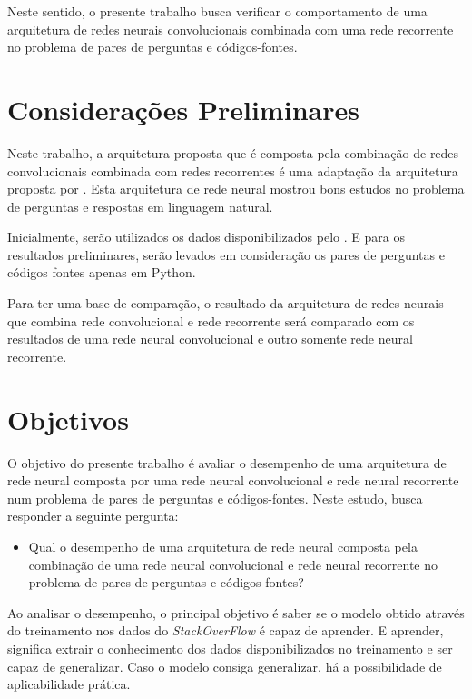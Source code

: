 Neste sentido, o presente trabalho busca verificar o comportamento de uma arquitetura de redes neurais convolucionais combinada com uma rede recorrente no problema de pares de perguntas e códigos-fontes.


\section{Considerações Preliminares}
\label{sec:consideracoes_preliminares}

Neste trabalho, a arquitetura proposta que é composta pela combinação de redes convolucionais combinada com redes recorrentes é uma adaptação da arquitetura proposta por \cite{feng-2015}. Esta arquitetura de rede neural mostrou bons estudos no problema de perguntas e respostas em linguagem natural. 

Inicialmente, serão utilizados os dados disponibilizados pelo \citeauthor{yao-2018}. E para os resultados preliminares, serão levados em consideração os pares de perguntas e códigos fontes apenas em Python. 

Para ter uma base de comparação, o resultado da arquitetura de redes neurais que combina rede convolucional e rede recorrente será comparado com os resultados de uma rede neural convolucional e outro somente rede neural recorrente.


\section{Objetivos}
\label{sec:objetivo}

O objetivo do presente trabalho é avaliar o desempenho de uma arquitetura de rede neural composta por uma rede neural convolucional e rede neural recorrente num problema de pares de perguntas e códigos-fontes. Neste estudo, busca responder a seguinte pergunta:

\begin{itemize}
    \item Qual o desempenho de uma arquitetura de rede neural composta pela combinação de uma rede neural convolucional e rede neural recorrente no problema de pares de perguntas e códigos-fontes? 
\end{itemize}

Ao analisar o desempenho, o principal objetivo é saber se o modelo obtido através do treinamento nos dados do \textit{StackOverFlow} é capaz de aprender. E aprender, significa extrair o conhecimento dos dados disponibilizados no treinamento e ser capaz de generalizar. Caso o modelo consiga generalizar, há a possibilidade de aplicabilidade prática.

